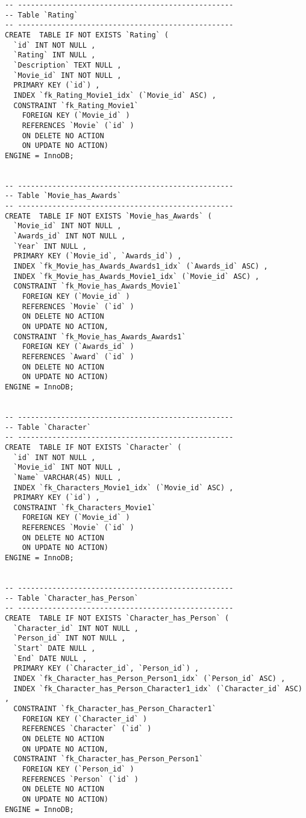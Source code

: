 \begin{lstlisting}[breaklines]
-- --------------------------------------------------
-- Table `Rating`
-- --------------------------------------------------
CREATE  TABLE IF NOT EXISTS `Rating` (
  `id` INT NOT NULL ,
  `Rating` INT NULL ,
  `Description` TEXT NULL ,
  `Movie_id` INT NOT NULL ,
  PRIMARY KEY (`id`) ,
  INDEX `fk_Rating_Movie1_idx` (`Movie_id` ASC) ,
  CONSTRAINT `fk_Rating_Movie1`
    FOREIGN KEY (`Movie_id` )
    REFERENCES `Movie` (`id` )
    ON DELETE NO ACTION
    ON UPDATE NO ACTION)
ENGINE = InnoDB;


-- --------------------------------------------------
-- Table `Movie_has_Awards`
-- --------------------------------------------------
CREATE  TABLE IF NOT EXISTS `Movie_has_Awards` (
  `Movie_id` INT NOT NULL ,
  `Awards_id` INT NOT NULL ,
  `Year` INT NULL ,
  PRIMARY KEY (`Movie_id`, `Awards_id`) ,
  INDEX `fk_Movie_has_Awards_Awards1_idx` (`Awards_id` ASC) ,
  INDEX `fk_Movie_has_Awards_Movie1_idx` (`Movie_id` ASC) ,
  CONSTRAINT `fk_Movie_has_Awards_Movie1`
    FOREIGN KEY (`Movie_id` )
    REFERENCES `Movie` (`id` )
    ON DELETE NO ACTION
    ON UPDATE NO ACTION,
  CONSTRAINT `fk_Movie_has_Awards_Awards1`
    FOREIGN KEY (`Awards_id` )
    REFERENCES `Award` (`id` )
    ON DELETE NO ACTION
    ON UPDATE NO ACTION)
ENGINE = InnoDB;


-- --------------------------------------------------
-- Table `Character`
-- --------------------------------------------------
CREATE  TABLE IF NOT EXISTS `Character` (
  `id` INT NOT NULL ,
  `Movie_id` INT NOT NULL ,
  `Name` VARCHAR(45) NULL ,
  INDEX `fk_Characters_Movie1_idx` (`Movie_id` ASC) ,
  PRIMARY KEY (`id`) ,
  CONSTRAINT `fk_Characters_Movie1`
    FOREIGN KEY (`Movie_id` )
    REFERENCES `Movie` (`id` )
    ON DELETE NO ACTION
    ON UPDATE NO ACTION)
ENGINE = InnoDB;


-- --------------------------------------------------
-- Table `Character_has_Person`
-- --------------------------------------------------
CREATE  TABLE IF NOT EXISTS `Character_has_Person` (
  `Character_id` INT NOT NULL ,
  `Person_id` INT NOT NULL ,
  `Start` DATE NULL ,
  `End` DATE NULL ,
  PRIMARY KEY (`Character_id`, `Person_id`) ,
  INDEX `fk_Character_has_Person_Person1_idx` (`Person_id` ASC) ,
  INDEX `fk_Character_has_Person_Character1_idx` (`Character_id` ASC) ,
  CONSTRAINT `fk_Character_has_Person_Character1`
    FOREIGN KEY (`Character_id` )
    REFERENCES `Character` (`id` )
    ON DELETE NO ACTION
    ON UPDATE NO ACTION,
  CONSTRAINT `fk_Character_has_Person_Person1`
    FOREIGN KEY (`Person_id` )
    REFERENCES `Person` (`id` )
    ON DELETE NO ACTION
    ON UPDATE NO ACTION)
ENGINE = InnoDB;



\end{lstlisting}
